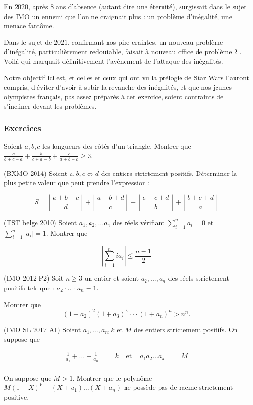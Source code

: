 
En $2020$, après $8$ ans d'absence (autant dire une éternité), surgissait dans le sujet des IMO un ennemi que l'on ne craignait plus : un problème d'inégalité, une menace fantôme.

Dans le sujet de $2021$, confirmant nos pire craintes, un nouveau problème d'inégalité, particulièrement redoutable, faisait à nouveau office de problème $2$ . Voilà qui marquait définitivement l'avènement de l'attaque des inégalités. 

Notre objectif ici est, et celles et ceux qui ont vu la prélogie de Star Wars l'auront compris, d'éviter d'avoir à subir la revanche des inégalités, et que nos jeunes olympistes français, pas assez préparés à cet exercice, soient contraints de s'incliner devant les problèmes. 

\subsubsection{Exercices}
\begin{exo}
Soient $a,b,c$ les longueurs des côtés d'un triangle. Montrer que $\frac{a}{b+c-a}+\frac{b}{c+a-b}+\frac{c}{a+b-c} \geq 3$.
\end{exo}

\begin{exo}
(BXMO 2014) Soient $a,b,c$ et $d$ des entiers strictement positifs. Déterminer la plus petite valeur que peut prendre l'expression : 

\[S=\left\lfloor \frac{a+b+c}{d}\right\rfloor + \left\lfloor \frac{a+b+d}{c}\right\rfloor + \left\lfloor \frac{a+c+d}{b}\right\rfloor +\left\lfloor \frac{b+c+d}{a}\right\rfloor\]
\end{exo}

\begin{exo}
(TST belge 2010) 
Soient $a_1,a_2,\ldots a_n$ des réels vérifiant $\sum_{i=1}^{n} a_i=0$ et $\sum_{i=1}^{n} |a_i| =1$. Montrer que 

\[\left| \sum_{i=1}^{n} ia_i \right| \leqslant \frac{n-1}2\]
\end{exo}


\begin{exo}
(IMO 2012 P2)
Soit $n \geq 3$ un entier et soient $a_2,...,a_n$ des réels strictement positifs tels que : $a_2 \cdot ... \cdot a_n =1$.

Montrer que 
\[
(1+a_2)^2(1+a_3)^3 \cdot \cdot \cdot (1+a_n)^n > n^n.
\]
\end{exo}

\begin{exo}
(IMO SL 2017 A1)
Soient $a_1, \ldots, a_n, k$ et $M$ des entiers strictement positifs. On suppose que 

\[\begin{array}{lllllll}
\frac1{a_1}+ \ldots + \frac1{a_n} &=& k &\text{ et }& a_1 a_2 \ldots a_n &=& M\\
\end{array}\]

On suppose que $M>1$. Montrer que le polynôme $M(1+X)^k-(X+a_1) \ldots (X+a_n)$ ne possède pas de racine strictement positive. 
\end{exo}

